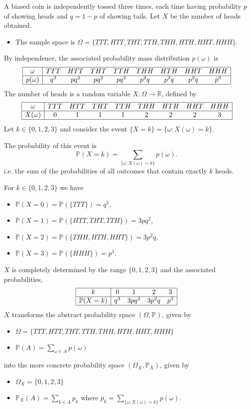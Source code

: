 \documentclass[lecture]{csm}
\newcommand{\R}{\mathbb{R}}
\newcommand{\prob}{\mathbb{P}}
\def\it{\item}
\def\bit{\begin{itemize}}
\def\eit{\end{itemize}}
\begin{document}
\begin{example}\label{ex:binomial}
A biased coin is independently tossed three times, each time having probability $p$ of showing heads and $q=1-p$ of showing tails. Let $X$ be the number of heads obtained.
\bit
\it The sample space is $\Omega=\{TTT,HTT,THT,TTH,THH,HTH,HHT,HHH\}$.
\eit
By independence, the associated probability mass distribution $p(\omega)$ is 
\[
\begin{array}{|c|cccccccc|} \hline
\omega 		& TTT & HTT & THT & TTH & THH & HTH & HHT & HHH \\ \hline
p(\omega) 	& q^3 & pq^2 & pq^2 & pq^2 & p^2q & p^2q & p^2q & p^3 \\  \hline
\end{array}
\]
The number of heads is a random variable $X:\Omega\to\R$, defined by
\[
\begin{array}{|c|cccccccc|} \hline
\omega 		& TTT & HTT & THT & TTH & THH & HTH & HHT & HHH \\ \hline
X(\omega) 	& 0 & 1 & 1 & 1 & 2 & 2 & 2 & 3 \\ \hline
\end{array}
\]
Let $k\in\{0,1,2,3\}$ and consider the event $\{X=k\} = \{\omega:X(\omega)=k\}$. 
\par
The probability of this event is
\[
\prob(X=k) = \sum_{\{\omega:X(\omega)=k\}} p(\omega).
\]
i.e. the sum of the probabilities of all outcomes that contain exactly $k$ heads.

\break %

For $k\in\{0,1,2,3\}$ we have
\bit
\it $\prob(X=0) = \prob(\{TTT\}) = q^3$,
\it $\prob(X=1) = \prob(\{HTT,THT,TTH\}) = 3pq^2$,
\it $\prob(X=2) = \prob(\{THH,HTH,HHT\}) = 3p^2q$,
\it $\prob(X=3) = \prob(\{HHH\}) = p^3$.
\eit
$X$ is completely determined by the range $\{0,1,2,3\}$ and the associated probabilities,
\[
\begin{array}{|c|cccc|} \hline
k 			& 0 & 1 & 2 & 3 \\ \hline
\prob(X=k)	& q^3 & 3pq^2 & 3p^2q & p^3 \\ \hline
\end{array}
\]
$X$ transforms the abstract probability space $(\Omega,\prob)$, given by
\bit
\it $\Omega=\{TTT,HTT,THT,TTH,THH,HTH,HHT,HHH\}$
\it $\prob(A) = \sum_{\omega\in A} p(\omega)$
\eit
into the more concrete probability space $(\Omega_X,\prob_X)$, given by
\bit
\it $\Omega_X=\{0,1,2,3\}$
\it $\prob_X(A) = \sum_{k\in A} p_k$ where $p_k = \sum_{\{\omega:X(\omega)=k\}} p(\omega)$.
\eit
%

\end{example}
\end{document}
